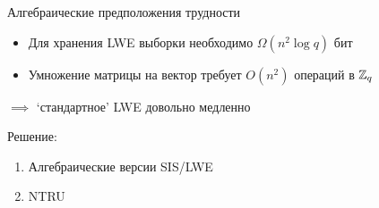 \documentclass[usenames,dvipsnames, 9pt]{beamer}
\begin{document}
\begin{frame}{Алгебраические предположения трудности}
		\Large 
	\begin{itemize}
		\setlength\itemsep{7pt}
		\item Для хранения LWE выборки необходимо $\Omega(n^2 \log q)$ бит
		\item  Умножение матрицы на вектор требует $O(n^2)$ операций в ${{\mathbb Z}}_q$
	\end{itemize}
	{\color{Orange} $\implies$ `стандартное' LWE довольно медленно }
	
	\vspace{15pt}
	
	\LARGE {\color{Orange}Решение:} 
	\begin{enumerate}
		\setlength\itemsep{5pt}
		\item Алгебраические версии SIS/LWE
		\item NTRU
	\end{enumerate}
\end{frame}
\end{document}
